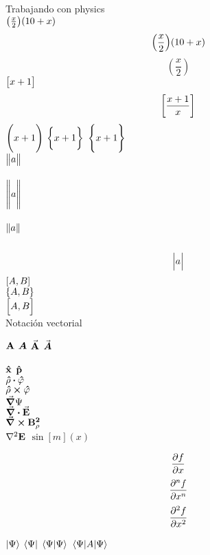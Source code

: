 \documentclass{article}
\begin{document}
\newpage
Trabajando con physics\\

$ \qty(\frac{x}{2}) \qty(10+x) $
$$ \qty(\frac{x}{2}) \qty(10+x) $$
$$ (\frac{x}{2}) $$
$\qty\big[x+1]$
$$\qty\bigg[\frac{x+1}{x}]$$
$\qty\Bigg(x+1)$
$\qty\bigg{x+1}$
$\qty\Bigg{x+1}$\\

$\norm\big{a}$\\\\
$\norm\Bigg{a}$\\\\
$\norm{a}$\\\\
$$\abs\Big{a}$$
$\comm{A}{B}$\\
$\acomm{A}{B}$\\
$\comm\Big{A}{B}$\\

Notación vectorial

$\vb{A}$ %
$\vb*{A}$
$\va{A}$
$\va*{A}$

$\vu{x}$
$\vu{p}$\\
$\vu{\rho} \vdot \vu{\varphi}$\\
$\vu{\rho}\cp \vu{\varphi}$\\

$\grad \Psi$\\
$\div \va{E} $\\
$\curl \vb{B_\rho^2}$\\
$\laplacian \vb{E}$
$\sin[m](x)$

$$\pdv{f}{x}$$
$$\pdv[n]{f}{x}$$
$$\pdv[2]{f}{x}$$

$\ket{\Psi}$
$\bra{\Psi}$
$\braket{\Psi}$
$\expval{A}{\Psi}$
\end{document}
